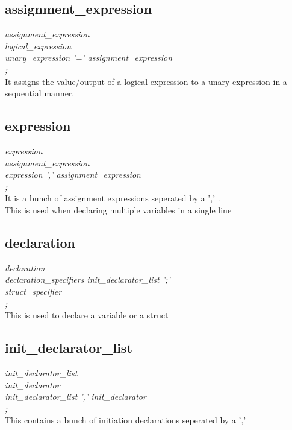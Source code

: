 \documentclass[11pt]{article}
\begin{document}
\subsection{assignment\_expression}
{\itshape
assignment\_expression\\
\hspace*{1cm} logical\_expression\\
\hspace*{1cm}   unary\_expression '=' assignment\_expression\\
\hspace*{1cm};\\
}
It assigns the value/output of a logical expression to a unary expression in a sequential manner.
\subsection{expression}
{\itshape
expression\\
\hspace*{1cm} assignment\_expression\\
\hspace*{1cm}   expression ',' assignment\_expression\\
\hspace*{1cm};\\
}
It is a bunch of assignment expressions seperated by a ',' .\\
This is used when declaring multiple variables in a single line
\subsection{declaration}
{\itshape
declaration\\
\hspace*{1cm} declaration\_specifiers init\_declarator\_list ';'\\
\hspace*{1cm}	 struct\_specifier\\
\hspace*{1cm};\\
}
This is used to declare a variable or a struct
\subsection{init\_declarator\_list}
{\itshape
init\_declarator\_list\\
\hspace*{1cm} init\_declarator\\
\hspace*{1cm}   init\_declarator\_list ',' init\_declarator\\
\hspace*{1cm};\\
}
This contains a bunch of initiation declarations seperated by a ','
\end{document}
